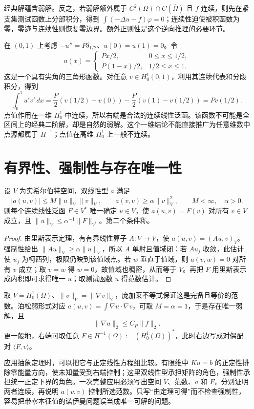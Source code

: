 \documentclass[UTF8,12pt,a4paper,fontset=fandol]{ctexbook}
\begin{document}
经典解蕴含弱解。反之，若弱解额外属于 $C^2(\Omega)\cap C(\overline\Omega)$ 且 $f$ 连续，则先在紧支集测试函数上分部积分，得到 $\int(-\Delta u-f)\varphi=0$；连续性迫使被积函数为零，零迹与连续性则恢复零边界。额外正则性是这个逆向推理的必要环节。

\begin{example}[集中载荷的弱解]
在 $(0,1)$ 上考虑 $-u''=P\delta_{1/2}$、$u(0)=u(1)=0$。令
\[
 u(x)=\begin{cases}Px/2,&0\le x\le1/2,\\P(1-x)/2,&1/2\le x\le1.\end{cases}
\]
这是一个具有尖角的三角形函数。对任意 $v\in H_0^1(0,1)$，利用其连续代表和分段积分，得到
\[
 \int_0^1u'v'\,dx
 =\frac P2(v(1/2)-v(0))-\frac P2(v(1)-v(1/2))=Pv(1/2).
\]
点值作用在一维 $H_0^1$ 中连续，所以右端是合法的连续线性泛函。该函数不可能是全区间上的经典二阶解，却是自然的弱解。这个一维结论不能直接推广为任意维数中点源都属于 $H^{-1}$；点值在高维 $H_0^1$ 上一般不连续。
\end{example}

\section{有界性、强制性与存在唯一性}
\begin{theorem}
设 $V$ 为实希尔伯特空间，双线性型 $a$ 满足
\[
 |a(u,v)|\le M\|u\|_V\|v\|_V,\qquad
 a(v,v)\ge\alpha\|v\|_V^2,
 \qquad M<\infty,\quad\alpha>0.
\]
则每个连续线性泛函 $F\in V^*$ 唯一确定 $u\in V$，使 $a(u,v)=F(v)$ 对所有 $v\in V$ 成立，且 $\|u\|_V\le\alpha^{-1}\|F\|_{V^*}$。第二个条件称。
\end{theorem}
\begin{proof}
由里斯表示定理，有有界线性算子 $A:V\to V$，使 $a(u,v)=(Au,v)_V$。强制性给出 $\|Au\|_V\ge\alpha\|u\|_V$，所以 $A$ 单射且值域闭：若 $Au_j$ 收敛，此估计使 $u_j$ 为柯西列，极限仍映到该值域点。若 $w$ 垂直于值域，则 $a(v,w)=0$ 对所有 $v$ 成立；取 $v=w$ 得 $w=0$，故值域也稠密，从而等于 $V$。再把 $F$ 用里斯表示成内积即可求得唯一 $u$；取测试函数 $u$ 得范数估计。
\end{proof}
取 $V=H_0^1(\Omega)$、$\|v\|_V=\|\nabla v\|_2$，庞加莱不等式保证这是完备且等价的范数。泊松弱形式对应 $a(u,v)=\int\nabla u\cdot\nabla v$，可取 $M=\alpha=1$，于是存在唯一弱解，且
\[
 \|\nabla u\|_2\le C_P\|f\|_2.
\]
更一般地，右端可取任意 $F\in H^{-1}(\Omega):=(H_0^1(\Omega))^*$，此时右边写成对偶配对 $\langle F,v\rangle$。

应用抽象定理时，可以把它与正定线性方程组比较。有限维中 $Ku=b$ 的正定性排除零能量方向，使未知量受到右端控制；这里双线性型承担矩阵的角色，强制性承担统一正定下界的角色。一次完整应用必须写出空间 $V$、范数、$a$ 和 $F$，分别证明两者连续，再说明 $a(v,v)$ 控制所选范数。只写“由定理可得”而不检查强制性，容易把带零本征值的诺伊曼问题误当成唯一可解的问题。
\end{document}

